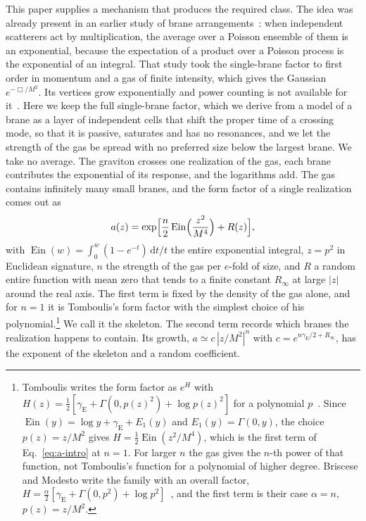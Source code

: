 \documentclass[aps,prd,10pt,twocolumn,superscriptaddress,nofootinbib,floatfix,longbibliography]{revtex4-2}
\newcommand{\dd}{\mathrm{d}}
\newcommand{\Ein}{\operatorname{Ein}}
\newcommand{\gE}{\gamma_{\mathrm E}}
\begin{document}
This paper supplies a mechanism that produces the required class. The idea was already present in an earlier study of brane arrangements~\cite{Bhattacharjee2026}: when independent scatterers act by multiplication, the average over a Poisson ensemble of them is an exponential, because the expectation of a product over a Poisson process is the exponential of an integral. That study took the single-brane factor to first order in momentum and a gas of finite intensity, which gives the Gaussian $e^{-\Box/M^2}$. Its vertices grow exponentially and power counting is not available for it~\cite{Talaganis2015}. Here we keep the full single-brane factor, which we derive from a model of a brane as a layer of independent cells that shift the proper time of a crossing mode, so that it is passive, saturates and has no resonances, and we let the strength of the gas be spread with no preferred size below the largest brane. We take no average. The graviton crosses one realization of the gas, each brane contributes the exponential of its response, and the logarithms add. The gas contains infinitely many small branes, and the form factor of a single realization comes out as
\begin{equation}
\label{eq:a-intro}
a(z)=\exp\Bigl[\frac n2\Ein\Bigl(\frac{z^2}{M^4}\Bigr)+R(z)\Bigr],
\end{equation}
with $\Ein(w)=\int_0^w(1-e^{-t})\,\dd t/t$ the entire exponential integral, $z=p^2$ in Euclidean signature, $n$ the strength of the gas per $e$-fold of size, and $R$ a random entire function with mean zero that tends to a finite constant $R_\infty$ at large $|z|$ around the real axis. The first term is fixed by the density of the gas alone, and for $n=1$ it is Tomboulis's form factor with the simplest choice of his polynomial.\footnote{Tomboulis writes the form factor as $e^{H}$ with $H(z)=\frac12[\gE+\Gamma(0,p(z)^2)+\log p(z)^2]$ for a polynomial $p$~\cite{Tomboulis1997}. Since $\Ein(y)=\log y+\gE+E_1(y)$ and $E_1(y)=\Gamma(0,y)$, the choice $p(z)=z/M^2$ gives $H=\frac12\Ein(z^2/M^4)$, which is the first term of Eq.~\eqref{eq:a-intro} at $n=1$. For larger $n$ the gas gives the $n$-th power of that function, not Tomboulis's function for a polynomial of higher degree. Briscese and Modesto write the family with an overall factor, $H=\frac\alpha2[\gE+\Gamma(0,p^2)+\log p^2]$~\cite{BrisceseModesto2019}, and the first term is their case $\alpha=n$, $p(z)=z/M^2$.} We call it the skeleton. The second term records which branes the realization happens to contain. Its growth, $a\simeq c\,|z/M^2|^{n}$ with $c=e^{n\gE/2+R_\infty}$, has the exponent of the skeleton and a random coefficient.
\end{document}
